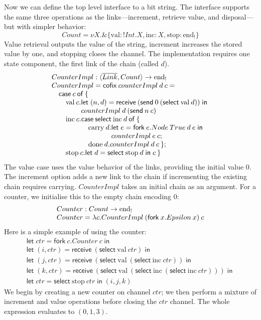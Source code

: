 \documentclass[orivec,envcountsame]{llncs}
\makeatletter
\newcommand{\with}{\mathbin\binampersand}
\newcommand{\gvdual}[1]{\overline{#1}}
\newcommand{\gvout}[2]{{!#1.#2}}
\newcommand{\uto}{\ensuremath{\rightarrow}}
\newcommand{\outterm}{\mathrm{end}_!}
\newcommand{\mkwd}[1]{\mathsf{#1}}
\newcommand{\clabel}[1]{\mathrm{#1}}
\newcommand{\gvsend}[2]{\mkwd{send}\:#1\:#2}
\newcommand{\gvreceive}[1]{\mkwd{receive}\:#1}
\newcommand{\gvlet}[3]{\mkwd{let}\;#1 = #2\;\mkwd{in}\;#3}
\newcommand{\gvselect}[2]{\mkwd{select}\:#1\:#2}
\newcommand{\gvfork}[2]{\mkwd{fork}\:#1.#2}
\newcommand{\lrkwd}{\mkwd{cofix}}
\newcommand{\ba}{\begin{array}}
\newcommand{\ea}{\end{array}}
\newcommand{\bl}{\ba[t]{@{}l@{}}}
\newcommand{\el}{\ea}
\makeatother
\begin{document}
Now we can define the top level interface to a bit string. The interface supports the same three
operations as the links---increment, retrieve value, and disposal---but with simpler behavior:
\[
  Count = \nu X. \with \{ \clabel{val}: \gvout{Int}{X}, \clabel{inc}: X, \clabel{stop}: \outterm \}
\]
Value retrieval outputs the value of the string, increment increases the stored value by one, and
stopping closes the channel. The implementation requires one state component, the first link of the
chain (called $d$).
\[
\bl
CounterImpl : \langle \gvdual{Link}, Count \rangle \uto \outterm \\
CounterImpl = \lrkwd\:counterImpl\:d\:c = \\
\quad \mkwd{case}\:c\:\mkwd{of}\:\{ \\
\quad \quad
  \bl
  \clabel{val}\:c.
     \bl
     \gvlet{(n,d)}{\gvreceive{(\gvsend{0}{(\gvselect{\clabel{val}}{d})})}} \\
     counterImpl\:d\:(\gvsend{n}{c}) \\
     \el \\
  \clabel{inc}\:c.
    \bl
    \mkwd{case}\:\gvselect{\clabel{inc}}{d}\:\mkwd{of}\:\{ \\
    \quad
      \bl
      \clabel{carry}\:d.
         \bl
         \gvlet{e}{\gvfork{e}{Node\:True\:d\:e}}{} \\
         counterImpl\:e\:c; \\
         \el \\
      \clabel{done}\:d.counterImpl\:d\:c\:\}; \\
      \el \\
    \el \\
  \clabel{stop}\:c.\gvlet{d}{\gvselect{\clabel{stop}}{d}}{c}\:\}
  \el \\
\el
\]
The value case uses the value behavior of the links, providing the initial value 0.  The increment
option adds a new link to the chain if incrementing the existing chain requires
carrying. $CounterImpl$ takes an initial chain as an argument. For a counter, we initialise this to
the empty chain encoding $0$:
\[\bl
  Counter : Count \uto \outterm \\
  Counter = \lambda c.CounterImpl\:(\gvfork{x}{Epsilon\:x})\:c \\
\el\]
Here is a simple example of using the counter:
\[\begin{array}{l}
\gvlet{ctr}{\gvfork{c}{Counter\:c}}{} \\
\gvlet{(i,ctr)}{\gvreceive{(\gvselect{\clabel{val}}{ctr})}}{} \\
\gvlet{(j,ctr)}{\gvreceive{(\gvselect{\clabel{val}}{(\gvselect{\clabel{inc}}{ctr})})}}{} \\
\gvlet{(k,ctr)}{\gvreceive{(\gvselect{\clabel{val}}{(\gvselect{\clabel{inc}}{(\gvselect{\clabel{inc}}{ctr})})})}}{} \\
\gvlet{ctr}{\gvselect{\clabel{stop}}{ctr}}{(i,j,k)}
\end{array}\]
We begin by creating a new counter on channel $ctr$; we then perform a mixture of increment and
value operations before closing the $ctr$ channel.  The whole expression evaluates to $(0,1,3)$.
\end{document}
